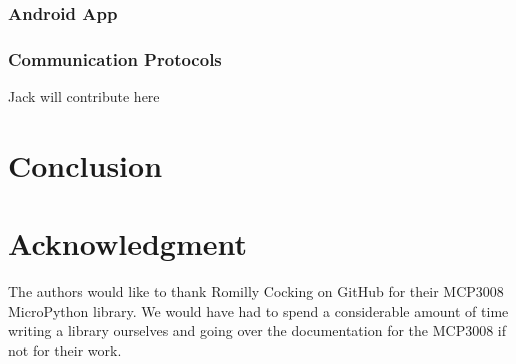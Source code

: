 \documentclass[11pt,journal]{IEEEtran}
\begin{document}
\subsubsection{Android App}
\subsubsection{Communication Protocols}
Jack will contribute here



% 


\section{Conclusion}



\section*{Acknowledgment}

The authors would like to thank Romilly Cocking on GitHub for their MCP3008 MicroPython library. We would have had to spend a considerable amount of time writing a library ourselves and going over the documentation for the MCP3008 if not for their work.\cite{cocking_pico_code_2023}




\end{document}
